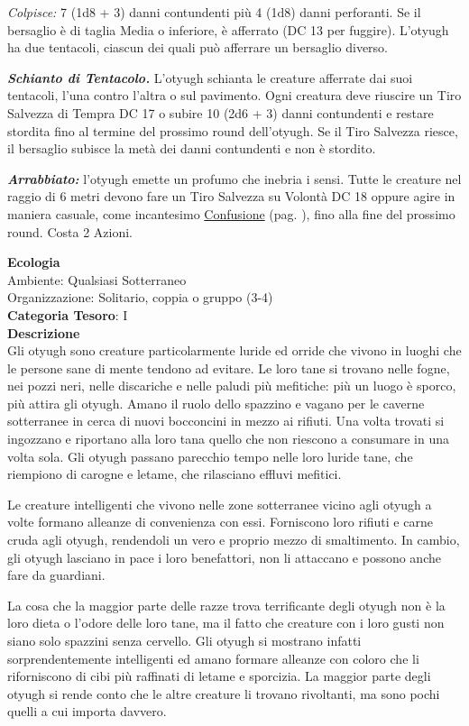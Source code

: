 \begin{multicols}{2}
{\emph{Colpisce:} 7 (1d8 + 3) danni contundenti più 4 (1d8) danni perforanti. Se il bersaglio è di taglia Media o inferiore, è afferrato (DC 13 per fuggire). L'otyugh ha due tentacoli, ciascun dei quali può afferrare un bersaglio diverso.

\emph{\textbf{Schianto di Tentacolo.}} L'otyugh schianta le creature afferrate dai suoi tentacoli, l'una contro l'altra o sul pavimento. Ogni creatura deve riuscire un Tiro Salvezza di Tempra DC 17 o subire 10 (2d6 + 3) danni contundenti e restare stordita fino al termine del prossimo round dell'otyugh. Se il Tiro Salvezza riesce, il bersaglio subisce la metà dei danni contundenti e non è stordito.

\emph{\textbf{Arrabbiato:}} l'otyugh emette un profumo che inebria i sensi. Tutte le creature nel raggio di 6 metri devono fare un Tiro Salvezza su Volontà DC 18 oppure agire in maniera casuale, come incantesimo \hyperlink{incconfusione}{Confusione} (pag. \pageref{incconfusione}), fino alla fine del prossimo round. Costa 2 Azioni.

\textbf{Ecologia}\\
Ambiente: Qualsiasi Sotterraneo\\
Organizzazione: Solitario, coppia o gruppo (3-4)\\
\textbf{Categoria Tesoro}: I\\
\textbf{Descrizione}\\
Gli otyugh sono creature particolarmente luride ed orride che vivono in luoghi che le persone sane di mente tendono ad evitare. Le loro tane si trovano nelle fogne, nei pozzi neri, nelle discariche e nelle paludi più mefitiche: più un luogo è sporco, più attira gli otyugh. Amano il ruolo dello spazzino e vagano per le caverne sotterranee in cerca di nuovi bocconcini in mezzo ai rifiuti. Una volta trovati si ingozzano e riportano alla loro tana quello che non riescono a consumare in una volta sola. Gli otyugh passano parecchio tempo nelle loro luride tane, che riempiono di carogne e letame, che rilasciano effluvi mefitici.

Le creature intelligenti che vivono nelle zone sotterranee vicino agli otyugh a volte formano alleanze di convenienza con essi. Forniscono loro rifiuti e carne cruda agli otyugh, rendendoli un vero e proprio mezzo di smaltimento. In cambio, gli otyugh lasciano in pace i loro benefattori, non li attaccano e possono anche fare da guardiani.

La cosa che la maggior parte delle razze trova terrificante degli otyugh non è la loro dieta o l'odore delle loro tane, ma il fatto che creature con i loro gusti non siano solo spazzini senza cervello. Gli otyugh si mostrano infatti sorprendentemente intelligenti ed amano formare alleanze con coloro che li riforniscono di cibi più raffinati di letame e sporcizia. La maggior parte degli otyugh si rende conto che le altre creature li trovano rivoltanti, ma sono pochi quelli a cui importa davvero.

}
\end{multicols}
